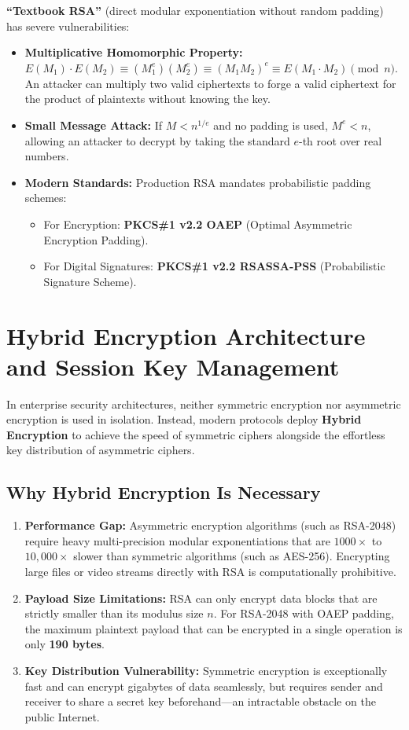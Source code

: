 \textbf{``Textbook RSA''} (direct modular exponentiation without random padding) has severe vulnerabilities:
\begin{itemize}
\item \textbf{Multiplicative Homomorphic Property:} $E(M_1) \cdot E(M_2) \equiv (M_1^e)(M_2^e) \equiv (M_1 M_2)^e \equiv E(M_1 \cdot M_2) \pmod n$. An attacker can multiply two valid ciphertexts to forge a valid ciphertext for the product of plaintexts without knowing the key.
\item \textbf{Small Message Attack:} If $M < n^{1/e}$ and no padding is used, $M^e < n$, allowing an attacker to decrypt by taking the standard $e$-th root over real numbers.
\item \textbf{Modern Standards:} Production RSA mandates probabilistic padding schemes:
\begin{itemize}
\item For Encryption: \textbf{PKCS\#1 v2.2 OAEP} (Optimal Asymmetric Encryption Padding).
\item For Digital Signatures: \textbf{PKCS\#1 v2.2 RSASSA-PSS} (Probabilistic Signature Scheme).
\end{itemize}
\end{itemize}

\newpage
\section{Hybrid Encryption Architecture and Session Key Management}

In enterprise security architectures, neither symmetric encryption nor asymmetric encryption is used in isolation. Instead, modern protocols deploy \textbf{Hybrid Encryption} to achieve the speed of symmetric ciphers alongside the effortless key distribution of asymmetric ciphers.

\subsection{Why Hybrid Encryption Is Necessary}

\begin{enumerate}
\item \textbf{Performance Gap:} Asymmetric encryption algorithms (such as RSA-2048) require heavy multi-precision modular exponentiations that are $1000\times$ to $10,000\times$ slower than symmetric algorithms (such as AES-256). Encrypting large files or video streams directly with RSA is computationally prohibitive.
\item \textbf{Payload Size Limitations:} RSA can only encrypt data blocks that are strictly smaller than its modulus size $n$. For RSA-2048 with OAEP padding, the maximum plaintext payload that can be encrypted in a single operation is only \textbf{190 bytes}.
\item \textbf{Key Distribution Vulnerability:} Symmetric encryption is exceptionally fast and can encrypt gigabytes of data seamlessly, but requires sender and receiver to share a secret key beforehand—an intractable obstacle on the public Internet.
\end{enumerate}

